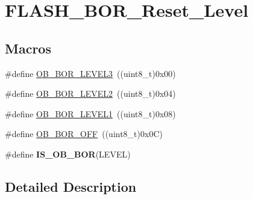 \hypertarget{group___f_l_a_s_h___b_o_r___reset___level}{\section{F\-L\-A\-S\-H\-\_\-\-B\-O\-R\-\_\-\-Reset\-\_\-\-Level}
\label{group___f_l_a_s_h___b_o_r___reset___level}
}
\subsection*{Macros}
\begin{DoxyCompactItemize}
\item 
\#define \hyperlink{group___f_l_a_s_h___b_o_r___reset___level_ga3132b8202c0a345e9dd33d136714b046}{O\-B\-\_\-\-B\-O\-R\-\_\-\-L\-E\-V\-E\-L3}~((uint8\-\_\-t)0x00)
\item 
\#define \hyperlink{group___f_l_a_s_h___b_o_r___reset___level_gad678e849fcf817f6ed2d837538e8ebc2}{O\-B\-\_\-\-B\-O\-R\-\_\-\-L\-E\-V\-E\-L2}~((uint8\-\_\-t)0x04)
\item 
\#define \hyperlink{group___f_l_a_s_h___b_o_r___reset___level_ga3a888b788e75f0bc1f9add85c9ccd9d6}{O\-B\-\_\-\-B\-O\-R\-\_\-\-L\-E\-V\-E\-L1}~((uint8\-\_\-t)0x08)
\item 
\#define \hyperlink{group___f_l_a_s_h___b_o_r___reset___level_gaabc231cb1d05a94fe860f67bb5a37b12}{O\-B\-\_\-\-B\-O\-R\-\_\-\-O\-F\-F}~((uint8\-\_\-t)0x0\-C)
\item 
\#define {\bfseries I\-S\-\_\-\-O\-B\-\_\-\-B\-O\-R}(L\-E\-V\-E\-L)
\end{DoxyCompactItemize}


\subsection{Detailed Description}


